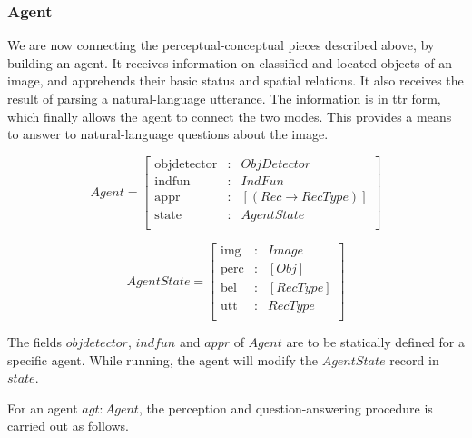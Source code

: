 \subsubsection{Agent}

We are now connecting the perceptual-conceptual pieces described above, by building an agent.
It receives information on classified and located objects of an image, and apprehends their basic status and spatial relations.
It also receives the result of parsing a natural-language utterance.
The information is in \gls{ttr} form, which finally allows the agent to connect the two modes.
This provides a means to answer to natural-language questions about the image.

\begin{equation}\label{eq:agent}
Agent = \left[\begin{array}{rcl}
    \text{objdetector} &:& ObjDetector \\
    \text{indfun} &:& IndFun \\
    \text{appr} &:& [(Rec \rightarrow RecType)] \\
    \text{state} &:& AgentState \\
    \end{array}\right]
\end{equation}

\begin{equation}\label{eq:state}
AgentState = \left[\begin{array}{rcl}
    \text{img} &:& Image \\
    \text{perc} &:& [Obj] \\
    \text{bel} &:& [RecType] \\
    \text{utt} &:& RecType \\
    \end{array}\right]
\end{equation}

The fields $objdetector$, $indfun$ and $appr$ of $Agent$ are to be statically defined for a specific agent.
While running, the agent will modify the $AgentState$ record in $state$.

For an agent $agt : Agent$, the perception and question-answering procedure is carried out as follows.

